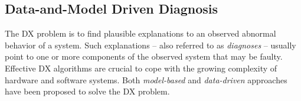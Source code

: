 \documentclass[12pt]{article}
\begin{document}





\subsection{Data-and-Model Driven Diagnosis}


The DX problem is to find plausible explanations to an observed abnormal behavior of a system. Such explanations -- also referred to as {\em diagnoses} -- usually point to one or more components of the observed system that may be faulty. 
Effective DX algorithms are crucial to cope with the growing complexity of hardware and software systems. 
Both  {\em model-based} and {\em data-driven} approaches have been proposed to solve the DX problem. 
\end{document}
